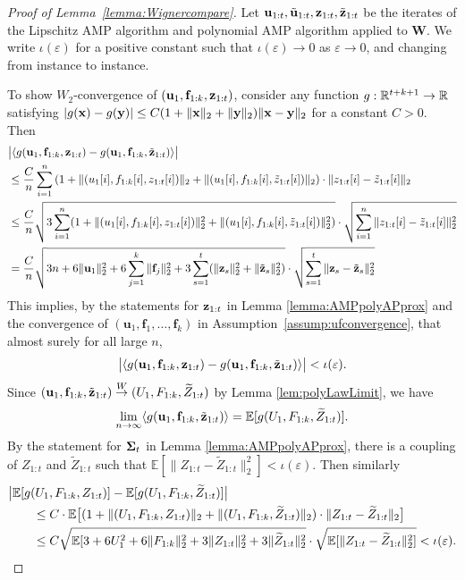 \documentclass[10pt,reqno]{amsart}
\def\u{\mathbf{u}}
\def\z{\mathbf{z}}
\def\f{\mathbf{f}}
\def\W{\mathbf{W}}
\def\E{\mathbb{E}}
\def\toW{\overset{W}{\to}}
\def\eps{\varepsilon}
\begin{document}
\begin{proof}[Proof of Lemma~\ref{lemma:Wignercompare}]
Let $\ub_{1:t},\tilde \ub_{1:t},\z_{1:t},\tilde \zb_{1:t}$ be the iterates of 
the Lipschitz AMP algorithm and polynomial AMP algorithm applied to $\W$. 
We write $\iota(\eps)$ for a positive constant such that $\iota(\eps) \to 0$ as 
$\eps \to 0$, and changing from instance to instance.

To show $W_2$-convergence of $(\mathbf{u}_1, \mathbf{f}_{1:k}, \mathbf{z}_{1:t})$,
consider any function $g: \mathbb{R}^{t+k+1} \to \mathbb{R}$ satisfying 
$|g(\mathbf{x}) - g(\mathbf{y})| \leq C(1 + \|\mathbf{x}\|_2 + \|\mathbf{y}\|_2) \|\mathbf{x} - \mathbf{y}\|_2$ for a
constant $C > 0$. Then
\begin{align*}
&\big|\langle g(\mathbf{u}_1, \mathbf{f}_{1:k}, \mathbf{z}_{1:t}) 
- g(\mathbf{u}_1, \mathbf{f}_{1:k}, \tilde{\mathbf{z}}_{1:t})\rangle\big|\\
&\leq \frac{C}{n} \sum_{i=1}^n 
\left(1 + \|(u_1[i], f_{1:k}[i], z_{1:t}[i])\|_2
+ \|(u_1[i], f_{1:k}[i], \tilde z_{1:t}[i])\|_2\right) 
\cdot \|z_{1:t}[i] - \tilde z_{1:t}[i]\|_2\\
&\leq \frac{C}{n} \sqrt{3\sum_{i=1}^n 
(1 + \|(u_1[i], f_{1:k}[i], z_{1:t}[i])\|_2^2
+ \|(u_1[i], f_{1:k}[i], \tilde z_{1:t}[i])\|_2^2)}
\cdot \sqrt{\sum_{i=1}^n \|z_{1:t}[i] - \tilde z_{1:t}[i]\|_2^2}\\
&= \frac{C}{n} \sqrt{3n + 6\|\mathbf{u}_1\|_2^2 + 6\sum_{j=1}^k \|\mathbf{f}_j\|_2^2 
+ 3\sum_{s=1}^t (\|\mathbf{z}_s\|_2^2 + \|\tilde{\mathbf{z}}_s\|_2^2)} 
\cdot \sqrt{\sum_{s=1}^t \|\mathbf{z}_s - \tilde{\mathbf{z}}_s\|_2^2}
\end{align*}
This implies, by the statements for $\mathbf{z}_{1:t}$ in
Lemma \ref{lemma:AMPpolyAPprox} and the convergence of
$(\u_1,\f_1,\ldots,\f_k)$ in Assumption~\ref{assump:ufconvergence}, that
almost surely for all large $n$,
\begin{equation}\label{eq:pseudo_lip_diff_bound}
\big|\langle g(\ub_1, \fb_{1:k}, \zb_{1:t}) 
- g(\ub_1, \fb_{1:k}, \tilde\zb_{1:t})\rangle\big|<\iota(\eps).
\end{equation}
Since $(\ub_1, \fb_{1:k}, \tilde\zb_{1:t}) \toW (U_1, F_{1:k}, 
\widetilde Z_{1:t})$ by Lemma \ref{lem:polyLawLimit}, we have 
\begin{align}\label{eq:pseudo_lip_aux_limit}
\lim_{n \to \infty} \langle g(\mathbf{u}_1, \mathbf{f}_{1:k}, \tilde{\mathbf{z}}_{1:t})\rangle 
= \mathbb{E}[g(U_1, F_{1:k}, \widetilde Z_{1:t})].
\end{align}
By the statement for $\bm{\Sigma}_t$ in Lemma \ref{lemma:AMPpolyAPprox}, there 
is a coupling of $Z_{1:t}$ and $\widetilde Z_{1:t}$ such that
$\E[\|Z_{1:t}-\widetilde Z_{1:t}\|_2^2]<\iota(\eps)$. Then similarly
\begin{align}\label{eq:pseudo_lip_aux_limit_bound}
&\big|\EE[g(U_1, F_{1:k}, Z_{1:t})] 
- \EE[g(U_1, F_{1:k}, \widetilde Z_{1:t})]\big|\notag\\
&\qquad \leq C \cdot \EE\big[(1 + \|(U_1, F_{1:k}, Z_{1:t})\|_2 
+ \|(U_1, F_{1:k}, \widetilde Z_{1:t})\|_2)
\cdot \|Z_{1:t}-\widetilde Z_{1:t}\|_2\big]\notag\\
&\qquad \leq C \sqrt{\EE[3+6U_1^2+6\|F_{1:k}\|_2^2
+3\|Z_{1:t}\|_2^2+3\|\widetilde Z_{1:t}\|_2^2} \cdot
\sqrt{\E[\|Z_{1:t}-\widetilde Z_{1:t}\|_2^2]}<\iota(\eps).
\end{align}


\end{proof}
\end{document}
